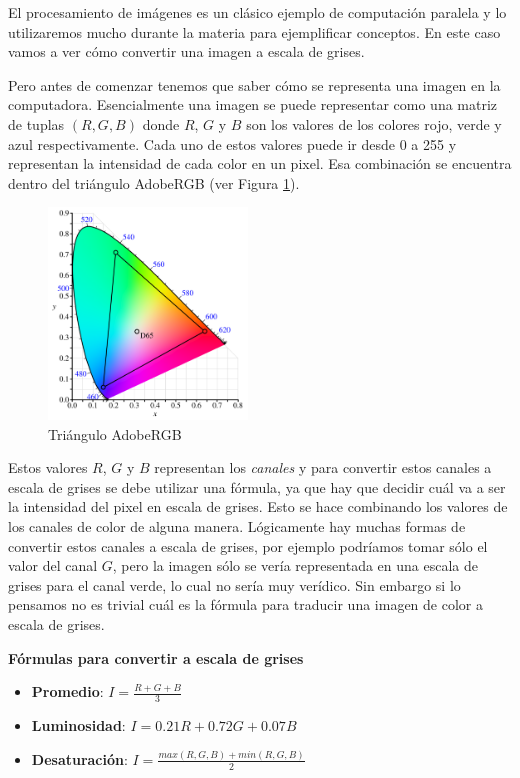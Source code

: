 El procesamiento de imágenes es un clásico ejemplo de computación paralela y lo utilizaremos mucho durante la materia
para ejemplificar conceptos. En este caso vamos a ver cómo convertir una imagen a escala de grises.

Pero antes de comenzar tenemos que saber cómo se representa una imagen en la computadora. Esencialmente una imagen se
puede representar como una matriz de tuplas $(R, G, B)$ donde $R$, $G$ y $B$ son los valores de los colores rojo, verde
y azul respectivamente. Cada uno de estos valores puede ir desde 0 a 255 y representan la intensidad de cada color en un
pixel. Esa combinación se encuentra dentro del triángulo AdobeRGB (ver Figura \ref{fig:adobe_rgb}).

\begin{figure}[H]
  \centering
  \includegraphics[width=200px]{./images/adobe_rgb.png}
  \caption{Triángulo AdobeRGB}
  \label{fig:adobe_rgb}
\end{figure}

Estos valores $R$, $G$ y $B$ representan los \textit{canales} y para convertir estos canales a escala de grises se debe
utilizar una fórmula, ya que hay que decidir cuál va a ser la intensidad del pixel en escala de grises. Esto se hace
combinando los valores de los canales de color de alguna manera. Lógicamente hay muchas formas de convertir estos
canales a escala de grises, por ejemplo podríamos tomar sólo el valor del canal $G$, pero la imagen sólo se vería
representada en una escala de grises para el canal verde, lo cual no sería muy verídico. Sin embargo si lo pensamos no
es trivial cuál es la fórmula para traducir una imagen de color a escala de grises. \\

\begin{tcolorbox}[colback=mint,colframe=yellow!75!black,arc=0pt,outer arc=0pt]
  \textbf{Fórmulas para convertir a escala de grises} \\

  \begin{itemize}
    \item \textbf{Promedio}: $I = \frac{R + G + B}{3}$
    \item \textbf{Luminosidad}: $I = 0.21R + 0.72G + 0.07B$
    \item \textbf{Desaturación}: $I = \frac{max(R, G, B) + min(R, G, B)}{2}$
  \end{itemize}
\end{tcolorbox}

